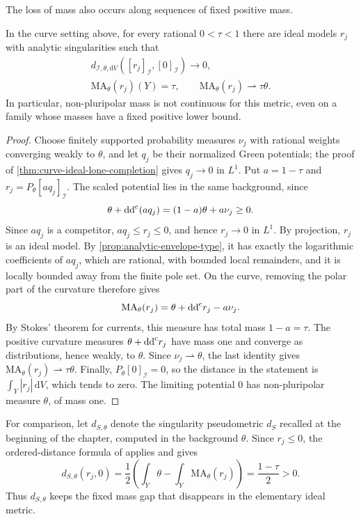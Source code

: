 The loss of mass also occurs along sequences of fixed positive mass.

\begin{proposition}\label{prop:positive-mass-ideal-discontinuity}
In the curve setting above, for every rational $0<\tau<1$ there are ideal models $r_j$ with analytic singularities such that
\[
 \begin{gathered}
 d_{\mathcal I,\theta,\mathrm{d}V}([r_j]_{\mathcal I},[0]_{\mathcal I})\longrightarrow0,\\
 \mathrm{MA}_\theta(r_j)(Y)=\tau,
 \qquad \mathrm{MA}_\theta(r_j)\rightharpoonup\tau\theta.
 \end{gathered}
\]
In particular, non-pluripolar mass is not continuous for this metric, even on a family whose masses have a fixed positive lower bound.
\end{proposition}
\begin{proof}
Choose finitely supported probability measures $\nu_j$ with rational weights converging weakly to $\theta$, and let $q_j$ be their normalized Green potentials; the proof of \cref{thm:curve-ideal-lone-completion} gives $q_j\to0$ in $L^1$. Put
$a=1-\tau$ and $r_j=P_\theta[a q_j]_{\mathcal I}$. The scaled potential lies in the same background, since
\[
 \theta+\mathrm{dd}^{\mathrm{c}}(aq_j)=(1-a)\theta+a\nu_j\geq0.
\]
Since $aq_j$ is a competitor, $aq_j\leq r_j\leq0$, and hence
$r_j\to0$ in $L^1$. By projection, $r_j$ is an ideal model. By \cref{prop:analytic-envelope-type}, it has exactly the logarithmic coefficients of $aq_j$, which are rational, with bounded local remainders, and it is locally bounded away from the finite pole set. On the curve, removing the polar part of the curvature therefore gives
\[
 \mathrm{MA}_\theta(r_j)=\theta+\mathrm{dd}^{\mathrm{c}} r_j-a\nu_j.
\]
By Stokes' theorem for currents, this measure has total mass $1-a=\tau$. The positive curvature measures $\theta+\mathrm{dd}^{\mathrm{c}} r_j$ have mass one and converge as distributions, hence weakly, to $\theta$. Since $\nu_j\rightharpoonup\theta$, the last identity gives $\mathrm{MA}_\theta(r_j)\rightharpoonup\tau\theta$. Finally,
$P_\theta[0]_{\mathcal I}=0$, so the distance in the statement is $\int_Y|r_j|\,\mathrm{d}V$, which tends to zero. The limiting potential $0$ has non-pluripolar measure $\theta$, of mass one.
\end{proof}

For comparison, let $d_{S,\theta}$ denote the singularity pseudometric $d_S$ recalled at the beginning of the chapter, computed in the background $\theta$. Since $r_j\leq0$, the ordered-distance formula of
\cite[Lemma~6.2.2]{SGPT} applies and gives
\[
 d_{S,\theta}(r_j,0)
 =\frac12\left(\int_Y\theta-\int_Y\mathrm{MA}_\theta(r_j)\right)
 =\frac{1-\tau}{2}>0.
\]
Thus $d_{S,\theta}$ keeps the fixed mass gap that disappears in the elementary ideal metric.

